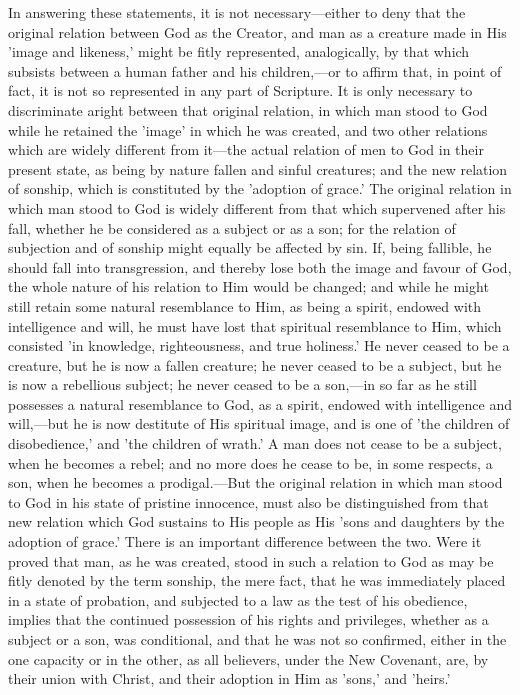 \documentclass[
]{book}
\begin{document}
In answering these statements, it is not necessary---either to deny that the original relation between God as the Creator, and man as a creature made in His 'image and likeness,' might be fitly represented, analogically, by that which subsists between a human father and his children,---or to affirm that, in point of fact, it is not so represented in any part of Scripture. It is only necessary to discriminate aright between that original relation, in which man stood to God while he retained the 'image' in which he was created, and two other relations which are widely different from it---the actual relation of men to God in their present state, as being by nature fallen and sinful creatures; and the new relation of sonship, which is constituted by the 'adoption of grace.' The original relation in which man stood to God is widely different from that which supervened after his fall, whether he be considered as a subject or as a son; for the relation of subjection and of sonship might equally be affected by sin. If, being fallible, he should fall into transgression, and thereby lose both the image and favour of God, the whole nature of his relation to Him would be changed; and while he might still retain some natural resemblance to Him, as being a spirit, endowed with intelligence and will, he must have lost that spiritual resemblance to Him, which consisted 'in knowledge, righteousness, and true holiness.' He never ceased to be a creature, but he is now a fallen creature; he never ceased to be a subject, but he is now a rebellious subject; he never ceased to be a son,---in so far as he still possesses a natural resemblance to God, as a spirit, endowed with intelligence and will,---but he is now destitute of His spiritual image, and is one of 'the children of disobedience,' and 'the children of wrath.' A man does not cease to be a subject, when he becomes a rebel; and no more does he cease to be, in some respects, a son, when he becomes a prodigal.---But the original relation in which man stood to God in his state of pristine innocence, must also be distinguished from that new relation which God sustains to His people as His 'sons and daughters by the adoption of grace.' There is an important difference between the two. Were it proved that man, as he was created, stood in such a relation to God as may be fitly denoted by the term sonship, the mere fact, that he was immediately placed in a state of probation, and subjected to a law as the test of his obedience, implies that the continued possession of his rights and privileges, whether as a subject or a son, was conditional, and that he was not so confirmed, either in the one capacity or in the other, as all believers, under the New Covenant, are, by their union with Christ, and their adoption in Him as 'sons,' and 'heirs.'
\end{document}
